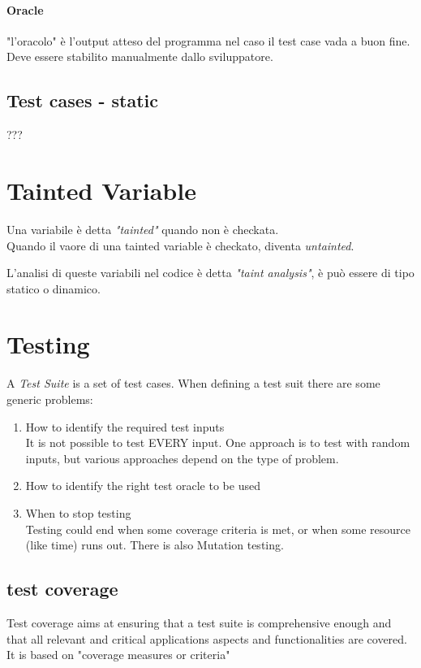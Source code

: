 \documentclass{article}
\begin{document}
\paragraph{Oracle} "l'oracolo" è l'output atteso del programma nel caso il test case vada a buon fine. Deve essere stabilito manualmente dallo sviluppatore.

\subsection{Test cases - static}
???

\section{Tainted Variable}
Una variabile è detta \textit{"tainted"} quando non è checkata. \\ 
Quando il vaore di una tainted variable è checkato, diventa \textit{untainted}.

L'analisi di queste variabili nel codice è detta \textit{"taint analysis"}, è può essere di tipo statico o dinamico.

\section{Testing}
A \textit{Test Suite} is a set of test cases. When defining a test suit there are some generic problems:
\begin{enumerate}
    \item How to identify the required test inputs \\
        It is not possible to test EVERY input. One approach is to test with random inputs, but various approaches depend on the type of problem.
    \item How to identify the right test oracle to be used
    \item When to stop testing \\
        Testing could end when some coverage criteria is met, or when some resource (like time) runs out. There is also Mutation testing.
\end{enumerate}

\subsection{test coverage}
Test coverage aims at ensuring that a test suite is comprehensive enough and that all relevant and critical applications aspects and functionalities are covered. It is based on "coverage measures or criteria"
\end{document}
